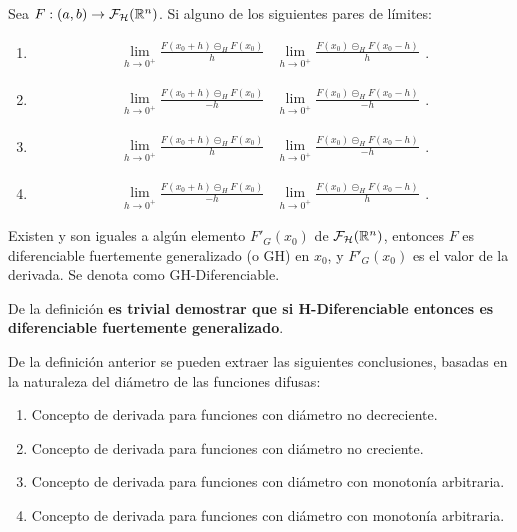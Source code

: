 \begin{definicion}
  Sea $F: (a, b) \rightarrow \mathcal{F}_\mathcal{H}(\mathbb R^n)$. Si alguno de los siguientes pares de límites:
  
  \begin{enumerate}
  \item 	
    \[
    \begin{array}{c||c}
      \lim\limits_{h \rightarrow 0^+} \frac{F(x_0 + h) \circleddash_H F(x_0)}{h} & \lim\limits_{h \rightarrow 0^+} \frac{F(x_0) \circleddash_H F(x_0 - h)}{h}
    \end{array}.
    \]
  \item 	
    \[
    \begin{array}{c||c}
      \lim\limits_{h \rightarrow 0^+} \frac{F(x_0 + h) \circleddash_H F(x_0)}{-h} & \lim\limits_{h \rightarrow 0^+} \frac{F(x_0) \circleddash_H F(x_0 - h)}{-h}
    \end{array}.
    \]
  \item 	
    \[
    \begin{array}{c||c}
      \lim\limits_{h \rightarrow 0^+} \frac{F(x_0 + h) \circleddash_H F(x_0)}{h} & \lim\limits_{h \rightarrow 0^+} \frac{F(x_0) \circleddash_H F(x_0 - h)}{-h}
    \end{array}.
    \]
  \item 	
    \[
    \begin{array}{c||c}
      \lim\limits_{h \rightarrow 0^+} \frac{F(x_0 + h) \circleddash_H F(x_0)}{-h} & \lim\limits_{h \rightarrow 0^+} \frac{F(x_0) \circleddash_H F(x_0 - h)}{h}
    \end{array}.
    \]
  \end{enumerate}
  Existen y son iguales a algún elemento $F'_G(x_0)$ de $\mathcal{F}_\mathcal{H}(\mathbb R^n)$, entonces $F$ es diferenciable fuertemente generalizado (o GH) en $x_0$, y $F'_G(x_0)$ es el valor de la derivada. Se denota como GH-Diferenciable.
\end{definicion}
De la definición \textbf{es trivial demostrar que si H-Diferenciable entonces es diferenciable fuertemente generalizado}.

\begin{observacion}
  De la definición anterior se pueden extraer las siguientes conclusiones, basadas en la naturaleza del diámetro de las funciones difusas:
  \begin{enumerate}
  \item Concepto de derivada para funciones con diámetro no decreciente.
  \item Concepto de derivada para funciones con diámetro no creciente.
  \item Concepto de derivada para funciones con diámetro con monotonía arbitraria.
  \item Concepto de derivada para funciones con diámetro con monotonía arbitraria.
  \end{enumerate}
\end{observacion} 

